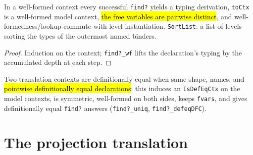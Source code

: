 \begin{lemma}
\label{family:vt-vlctx-wf-lemmas}
\leanok
{} In a well-formed context every successful \texttt{find?} yields a typing derivation, \texttt{toCtx} is a well-formed model context, \hl{the free variables are pairwise distinct}, and well-formedness/lookup commute with level instantiation. \texttt{SortList}: a list of levels sorting the types of the outermost named binders.
\end{lemma}
\begin{proof}
\leanok
{} Induction on the context; \texttt{find?\_wf} lifts the declaration's typing by the accumulated depth at each step.
\end{proof}

\begin{definition}
\label{ind:vt-vlctx-isdefeq}
\leanok
{}
 Two translation contexts are definitionally equal when same shape, names, and \hl{pointwise definitionally equal declarations}: this induces an \texttt{IsDefEqCtx} on the model contexts, is symmetric, well-formed on both sides, keeps \texttt{fvars}, and gives definitionally equal \texttt{find?} answers (\texttt{find?\_uniq}, \texttt{find?\_defeqDFC}).
\end{definition}

\section{The projection translation}

